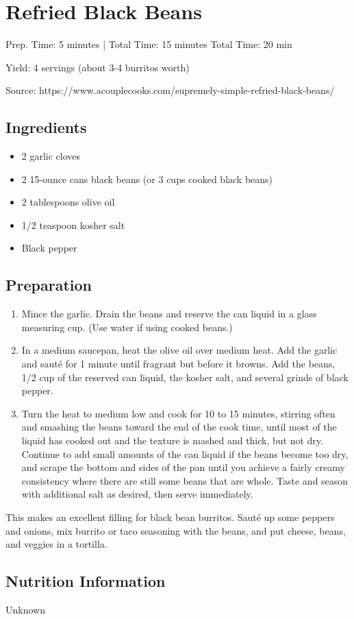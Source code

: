 \section{Refried Black Beans}

\begin{center}
Prep. Time: 5 minutes |
Total Time: 15 minutes
Total Time: 20 min

  \noindent Yield: 4 servings (about 3-4 burritos worth)

\vspace{1em}

  Source: https://www.acouplecooks.com/supremely-simple-refried-black-beans/
\end{center}

\subsection{Ingredients}
\begin{multicols}{2}
\begin{itemize}
  \item 2 garlic cloves
  \item 2 15-ounce cans black beans (or 3 cups cooked black beans)
  \item 2 tablespoons olive oil
  \item 1/2 teaspoon kosher salt
  \item Black pepper
\end{itemize}
\end{multicols}

\subsection{Preparation}
\begin{enumerate}
  \item Mince the garlic. Drain the beans and reserve the can liquid in a glass measuring cup. (Use water if using cooked beans.)
  \item In a medium saucepan, heat the olive oil over medium heat. Add the garlic and sauté for 1 minute until fragrant but before it browns. Add the beans, 1/2 cup of the reserved can liquid, the kosher salt, and several grinds of black pepper.
  \item Turn the heat to medium low and cook for 10 to 15 minutes, stirring often and smashing the beans toward the end of the cook time, until most of the liquid has cooked out and the texture is mashed and thick, but not dry. Continue to add small amounts of the can liquid if the beans become too dry, and scrape the bottom and sides of the pan until you achieve a fairly creamy consistency where there are still some beans that are whole. Taste and season with additional salt as desired, then serve immediately.
\end{enumerate}
This makes an excellent filling for black bean burritos.
Saut\'{e} up some peppers and onions, mix burrito or taco seasoning with the beans, and put cheese, beans, and veggies in a tortilla.

\subsection{Nutrition Information}
Unknown

